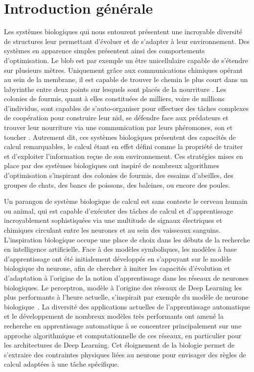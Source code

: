 \chapter*{Introduction générale}


Les systèmes biologiques qui nous entourent présentent une incroyable diversité de structures leur permettant d'évoluer et de s'adapter à leur environnement.
Des systèmes en apparence simples présentent ainsi des comportements d'optimisation. Le blob est par exemple un être unicellulaire capable de s'étendre sur plusieurs mètres. Uniquement grâce aux communications chimiques opérant au sein de la membrane, il est capable de trouver le chemin le plus court dans un labyrinthe entre deux points sur lesquels sont placés de la nourriture \cite{Nakagaki2000IntelligenceMB}.
Les colonies de fourmis, quant à elles constituées de milliers, voire de millions d'individus, sont capables de s'auto-organiser pour effectuer des tâches complexes de coopération pour construire leur nid, se défendre face aux prédateurs et trouver leur nourriture via une communication par leurs phéromones, son et toucher \cite{jackson_communication_2006}.
Autrement dit, ces systèmes biologiques présentent des capacités de calcul remarquables, le calcul étant en effet défini comme la propriété de traiter et d'exploiter l'information reçue de son environnement.
Ces stratégies mises en place par des systèmes biologiques ont inspiré de nombreux algorithmes d'optimisation s'inspirant des colonies de fourmis, des essaims d'abeilles, des groupes de chats, des bancs de poissons, des baleines, ou encore des poules.

Un parangon de système biologique de calcul est sans conteste le cerveau humain ou animal, qui est capable d'exécuter des tâches de calcul et d'apprentissage incroyablement sophistiquées via une multitude de signaux électriques et chimiques circulant entre les neurones et au sein des vaisseaux sanguins.
L'inspiration biologique occupe une place de choix dans les débuts de la recherche en intelligence artificielle.
Face à des modèles symboliques, les modèles à base d'apprentissage ont été initialement développés en s'appuyant sur le modèle biologique du neurone, afin de chercher à imiter les capacités d'évolution et d'adaptation à l'origine de la notion d'apprentissage dans les réseaux de neurones biologiques.
Le perceptron, modèle à l'origine des réseaux de Deep Learning les plus performants à l'heure actuelle, s'inspirait par exemple du modèle de neurone biologique~\cite{McCulloch1990ALC}.
La diversité des applications actuelles de l'apprentissage automatique et le développement de nombreux modèles très performants ont amené la recherche en apprentissage automatique à se concentrer principalement sur une approche algorithmique et computationnelle de ces réseaux, en particulier pour les architectures de Deep Learning. 
Cet éloignement de la biologie permet de s'extraire des contraintes physiques liées au neurone pour envisager des règles de calcul adaptées à une tâche spécifique.



